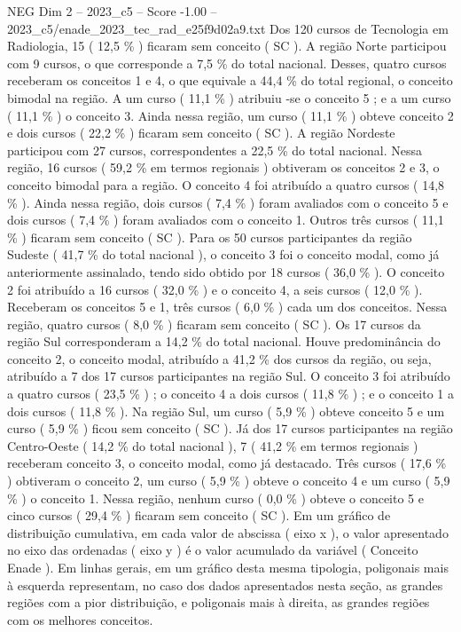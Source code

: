 \begin{textsample}{NEG Dim 2 – 2023\_c5 – Score -1.00 – 2023\_c5/enade\_2023\_tec\_rad\_e25f9d02a9.txt}
Dos 120 cursos de Tecnologia em Radiologia, 15 ( 12,5 \% ) ficaram sem conceito ( SC ).
A região Norte participou com 9 cursos, o que corresponde a 7,5 \% do total nacional.
Desses, quatro cursos receberam os conceitos 1 e 4, o que equivale a 44,4 \% do total regional, o conceito bimodal na região.
A um curso ( 11,1 \% ) atribuiu -se o conceito 5 ; e a um curso ( 11,1 \% ) o conceito 3.
Ainda nessa região, um curso ( 11,1 \% ) obteve conceito 2 e dois cursos ( 22,2 \% ) ficaram sem conceito ( SC ).
A região Nordeste participou com 27 cursos, correspondentes a 22,5 \% do total nacional.
Nessa região, 16 cursos ( 59,2 \% em termos regionais ) obtiveram os conceitos 2 e 3, o conceito bimodal para a região.
O conceito 4 foi atribuído a quatro cursos ( 14,8 \% ).
Ainda nessa região, dois cursos ( 7,4 \% ) foram avaliados com o conceito 5 e dois cursos ( 7,4 \% ) foram avaliados com o conceito 1.
Outros três cursos ( 11,1 \% ) ficaram sem conceito ( SC ).
Para os 50 cursos participantes da região Sudeste ( 41,7 \% do total nacional ), o conceito 3 foi o conceito modal, como já anteriormente assinalado, tendo sido obtido por 18 cursos ( 36,0 \% ).
O conceito 2 foi atribuído a 16 cursos ( 32,0 \% ) e o conceito 4, a seis cursos ( 12,0 \% ).
Receberam os conceitos 5 e 1, três cursos ( 6,0 \% ) cada um dos conceitos.
Nessa região, quatro cursos ( 8,0 \% ) ficaram sem conceito ( SC ).
Os 17 cursos da região Sul corresponderam a 14,2 \% do total nacional.
Houve predominância do conceito 2, o conceito modal, atribuído a 41,2 \% dos cursos da região, ou seja, atribuído a 7 dos 17 cursos participantes na região Sul.
O conceito 3 foi atribuído a quatro cursos ( 23,5 \% ) ; o conceito 4 a dois cursos ( 11,8 \% ) ; e o conceito 1 a dois cursos ( 11,8 \% ).
Na região Sul, um curso ( 5,9 \% ) obteve conceito 5 e um curso ( 5,9 \% ) ficou sem conceito ( SC ).
Já dos 17 cursos participantes na região Centro-Oeste ( 14,2 \% do total nacional ), 7 ( 41,2 \% em termos regionais ) receberam conceito 3, o conceito modal, como já destacado.
Três cursos ( 17,6 \% ) obtiveram o conceito 2, um curso ( 5,9 \% ) obteve o conceito 4 e um curso ( 5,9 \% ) o conceito 1.
Nessa região, nenhum curso ( 0,0 \% ) obteve o conceito 5 e cinco cursos ( 29,4 \% ) ficaram sem conceito ( SC ).
Em um gráfico de distribuição cumulativa, em cada valor de abscissa ( eixo x ), o valor apresentado no eixo das ordenadas ( eixo y ) é o valor acumulado da variável ( Conceito Enade ).
Em linhas gerais, em um gráfico desta mesma tipologia, poligonais mais à esquerda representam, no caso dos dados apresentados nesta seção, as grandes regiões com a pior distribuição, e poligonais mais à direita, as grandes regiões com os melhores conceitos.

\end{textsample}
